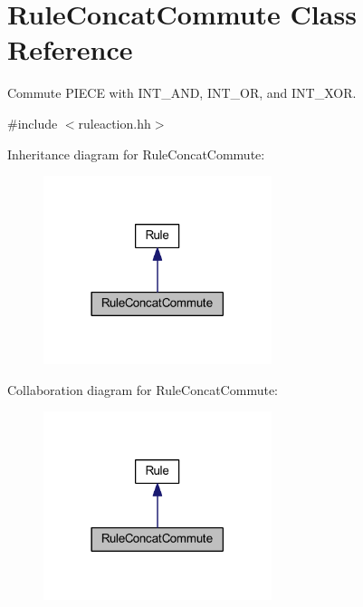 \hypertarget{class_rule_concat_commute}{}\section{Rule\+Concat\+Commute Class Reference}
\label{class_rule_concat_commute}


Commute P\+I\+E\+CE with I\+N\+T\+\_\+\+A\+ND, I\+N\+T\+\_\+\+OR, and I\+N\+T\+\_\+\+X\+OR.  




{\ttfamily \#include $<$ruleaction.\+hh$>$}



Inheritance diagram for Rule\+Concat\+Commute\+:
\nopagebreak
\begin{figure}[H]
\begin{center}
\leavevmode
\includegraphics[width=189pt]{class_rule_concat_commute__inherit__graph}
\end{center}
\end{figure}


Collaboration diagram for Rule\+Concat\+Commute\+:
\nopagebreak
\begin{figure}[H]
\begin{center}
\leavevmode
\includegraphics[width=189pt]{class_rule_concat_commute__coll__graph}
\end{center}
\end{figure}
